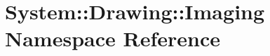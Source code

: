 \section{System::Drawing::Imaging Namespace Reference}
\label{namespace_system_1_1_drawing_1_1_imaging}


